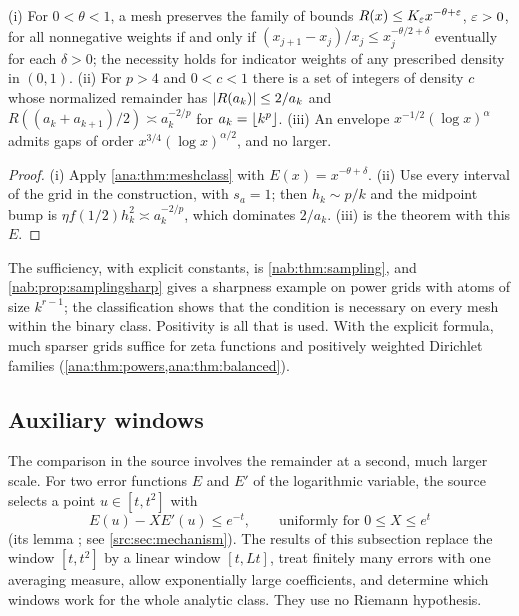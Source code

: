 \begin{corollary}\label{ana:cor:meshclass}
(i) For $0<\theta<1$, a mesh preserves the family of bounds $R(x)\le K_\varepsilon x^{-\theta+\varepsilon}$,
$\varepsilon>0$, for all nonnegative weights if and only if
$(x_{j+1}-x_j)/x_j\le x_j^{-\theta/2+\delta}$ eventually for each $\delta>0$; the necessity holds
for indicator weights of any prescribed density in $(0,1)$. (ii) For $p>4$ and $0<c<1$ there is
a set of integers of density $c$ whose normalized remainder has $\lvert R(a_k)\rvert\le2/a_k$ and
$R((a_k+a_{k+1})/2)\asymp a_k^{-2/p}$ for $a_k=\lfloor k^p\rfloor$. (iii) An envelope
$x^{-1/2}(\log x)^\alpha$ admits gaps of order $x^{3/4}(\log x)^{\alpha/2}$, and no larger.
\end{corollary}

\begin{proof}
(i) Apply \cref{ana:thm:meshclass} with $E(x)=x^{-\theta+\delta}$. (ii) Use every interval of the
grid in the construction, with $s_a=1$; then $h_k\sim p/k$ and the midpoint bump is
$\eta f(1/2)h_k^2\asymp a_k^{-2/p}$, which dominates $2/a_k$. (iii) is the theorem with this $E$.
\end{proof}

The sufficiency, with explicit constants, is \cref{nab:thm:sampling}, and
\cref{nab:prop:samplingsharp} gives a sharpness example on power grids with atoms of size
$k^{r-1}$; the classification shows that the condition is necessary on every mesh within the
binary class. Positivity is all that is used. With the explicit formula, much sparser grids
suffice for zeta functions and positively weighted Dirichlet families
(\cref{ana:thm:powers,ana:thm:balanced}).

\subsection{Auxiliary windows}\label{ana:sec:window}
{\raggedright{}}

The comparison in the source involves the remainder at a second, much larger scale. For two
error functions $E$ and $E'$ of the logarithmic variable, the source selects a point
$u\in[t,t^2]$ with
\[
 E(u)-XE'(u)\le e^{-t},\qquad\text{uniformly for }0\le X\le e^t
\]
(its lemma ; see \cref{src:sec:mechanism}). The results
of this
subsection replace the window $[t,t^2]$ by a linear window $[t,Lt]$, treat finitely many errors
with one averaging measure, allow exponentially large coefficients, and determine which
windows work for the whole analytic class. They use no Riemann hypothesis.


